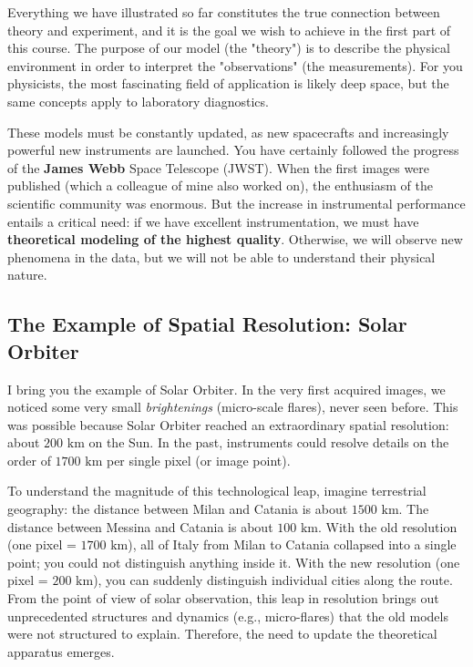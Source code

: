 Everything we have illustrated so far constitutes the true connection between theory and experiment, and it is the goal we wish to achieve in the first part of this course. The purpose of our model (the "theory") is to describe the physical environment in order to interpret the "observations" (the measurements).
For you physicists, the most fascinating field of application is likely deep space, but the same concepts apply to laboratory diagnostics.

These models must be constantly updated, as new spacecrafts and increasingly powerful new instruments are launched. You have certainly followed the progress of the \textbf{James Webb} Space Telescope (JWST). When the first images were published (which a colleague of mine also worked on), the enthusiasm of the scientific community was enormous. But the increase in instrumental performance entails a critical need: if we have excellent instrumentation, we must have \textbf{theoretical modeling of the highest quality}. Otherwise, we will observe new phenomena in the data, but we will not be able to understand their physical nature.

    \subsection{The Example of Spatial Resolution: Solar Orbiter}
    
    I bring you the example of Solar Orbiter. In the very first acquired images, we noticed some very small \textit{brightenings} (micro-scale flares), never seen before. This was possible because Solar Orbiter reached an extraordinary spatial resolution: about $200\text{ km}$ on the Sun.
    In the past, instruments could resolve details on the order of $1700\text{ km}$ per single pixel (or image point).
    
    To understand the magnitude of this technological leap, imagine terrestrial geography: the distance between Milan and Catania is about $1500\text{ km}$. The distance between Messina and Catania is about $100\text{ km}$.
    With the old resolution (one pixel = $1700\text{ km}$), all of Italy from Milan to Catania collapsed into a single point; you could not distinguish anything inside it. With the new resolution (one pixel = $200\text{ km}$), you can suddenly distinguish individual cities along the route.
    From the point of view of solar observation, this leap in resolution brings out unprecedented structures and dynamics (e.g., micro-flares) that the old models were not structured to explain. Therefore, the need to update the theoretical apparatus emerges.

